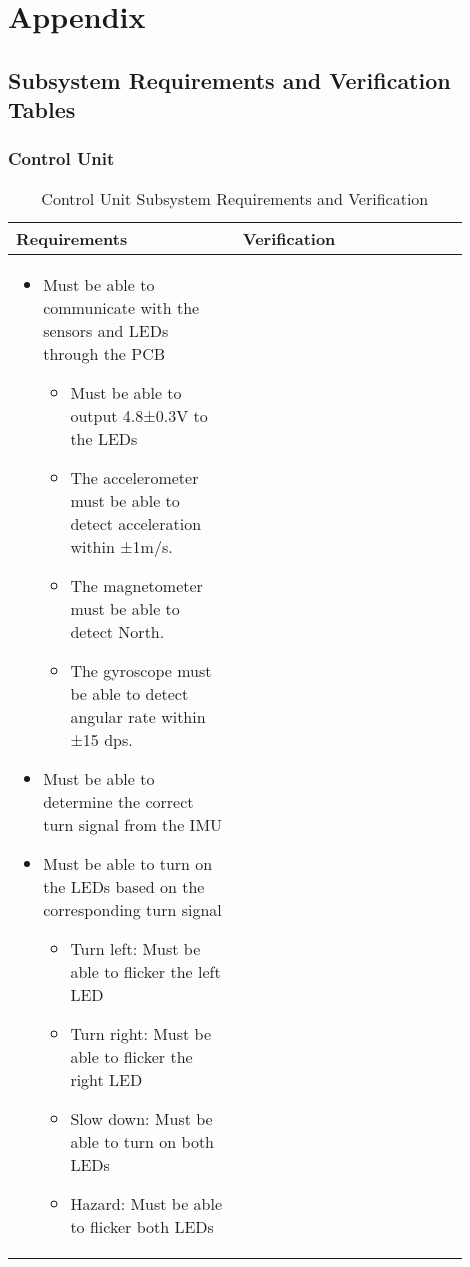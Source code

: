 \section{Appendix} \label{appendix:a}



\subsection{Subsystem Requirements and Verification Tables} \label{appendix:a:subsystemreqs}

\subsubsection{Control Unit}
\begin{table}[h]
    \centering
    \caption{Control Unit Subsystem Requirements and Verification}
    \begin{tabular}{p{0.45\linewidth}p{0.45\linewidth}}
    \toprule
    \textbf{Requirements} & \textbf{Verification} \\
    \midrule
    \begin{itemize}[leftmargin=*, nosep, after=\strut]
        \item Must be able to communicate with the sensors and LEDs through the PCB
        \begin{itemize}[nosep]
            \item Must be able to output 4.8±0.3V to the LEDs
            \item The accelerometer must be able to detect acceleration within ±1m/s.
            \item The magnetometer must be able to detect North.
            \item The gyroscope must be able to detect angular rate within ±15 dps.
        \end{itemize}
        \item Must be able to determine the correct turn signal from the IMU
        \item Must be able to turn on the LEDs based on the corresponding turn signal
        \begin{itemize}[nosep]
            \item Turn left: Must be able to flicker the left LED
            \item Turn right: Must be able to flicker the right LED
            \item Slow down: Must be able to turn on both LEDs
            \item Hazard: Must be able to flicker both LEDs

\end{itemize}
\end{itemize}
\end{tabular}
\end{table}
